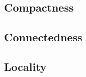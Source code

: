 \documentclass[11pt]{article}
\begin{document}
\subsection{Compactness}

\subsection{Connectedness}


\subsection{Locality}


\end{document}
